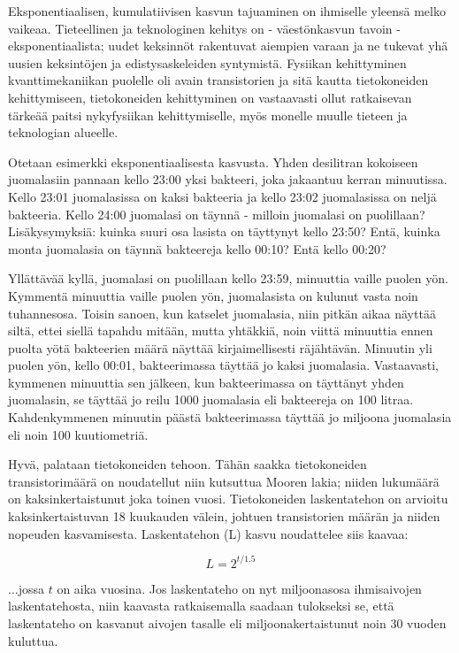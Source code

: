 Eksponentiaalisen, kumulatiivisen kasvun tajuaminen on ihmiselle yleensä melko vaikeaa. Tieteellinen ja teknologinen kehitys on - väestönkasvun tavoin - eksponentiaalista; uudet keksinnöt rakentuvat aiempien varaan ja ne tukevat yhä uusien keksintöjen ja edistysaskeleiden syntymistä. Fysiikan kehittyminen kvanttimekaniikan puolelle oli avain transistorien ja sitä kautta tietokoneiden kehittymiseen, tietokoneiden kehittyminen on vastaavasti ollut ratkaisevan tärkeää paitsi nykyfysiikan kehittymiselle, myös monelle muulle tieteen ja teknologian alueelle.


Otetaan esimerkki eksponentiaalisesta kasvusta. Yhden desilitran kokoiseen juomalasiin pannaan kello 23:00 yksi bakteeri, joka jakaantuu kerran minuutissa. Kello 23:01 juomalasissa on kaksi bakteeria ja kello 23:02 juomalasissa on neljä bakteeria. Kello 24:00 juomalasi on täynnä - milloin juomalasi on puolillaan? Lisäkysymyksiä: kuinka suuri osa lasista on täyttynyt kello 23:50? Entä, kuinka monta juomalasia on täynnä bakteereja kello 00:10? Entä kello 00:20?


Yllättävää kyllä, juomalasi on puolillaan kello 23:59, minuuttia vaille puolen yön. Kymmentä minuuttia vaille puolen yön, juomalasista on kulunut vasta noin tuhannesosa. Toisin sanoen, kun katselet juomalasia, niin pitkän aikaa näyttää siltä, ettei siellä tapahdu mitään, mutta yhtäkkiä, noin viittä minuuttia ennen puolta yötä bakteerien määrä näyttää kirjaimellisesti räjähtävän. Minuutin yli puolen yön, kello 00:01, bakteerimassa täyttää jo kaksi juomalasia. Vastaavasti, kymmenen minuuttia sen jälkeen, kun bakteerimassa on täyttänyt yhden juomalasin, se täyttää jo reilu 1000 juomalasia eli bakteereja on 100 litraa. Kahdenkymmenen minuutin päästä bakteerimassa täyttää jo miljoona juomalasia eli noin 100 kuutiometriä.


Hyvä, palataan tietokoneiden tehoon. Tähän saakka tietokoneiden transistorimäärä on noudatellut niin kutsuttua Mooren lakia; niiden lukumäärä on kaksinkertaistunut joka toinen vuosi. Tietokoneiden laskentatehon on arvioitu kaksinkertaistuvan 18 kuukauden välein, johtuen transistorien määrän ja niiden nopeuden kasvamisesta. Laskentatehon (L) kasvu noudattelee siis kaavaa:


\[ L = 2^{t/1.5} \]


...jossa $t$ on aika vuosina. Jos laskentateho on nyt miljoonasosa ihmisaivojen laskentatehosta, niin kaavasta ratkaisemalla saadaan tulokseksi se, että laskentateho on kasvanut aivojen tasalle eli miljoonakertaistunut noin 30 vuoden kuluttua.


